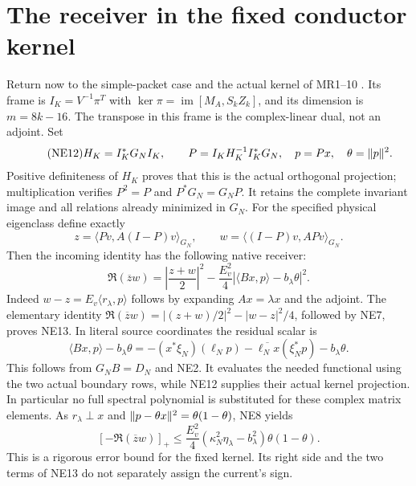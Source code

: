 \documentclass[11pt]{article}
\begin{document}
\section{The receiver in the fixed conductor kernel}
Return now to the simple-packet case and the actual kernel of MR1--10
\cite{ne-MR}. Its frame is $I_K=V^{-1}\pi^T$ with
$\ker\pi=\operatorname{im}[M_A,S_kZ_k]$, and its dimension is
$m=8k-16$. The transpose in this frame is the complex-linear dual,
not an adjoint. Set
\begin{equation}\tag{NE12}
H_K=I_K^*G_NI_K,\qquad P=I_KH_K^{-1}I_K^*G_N,
\quad p=Px,\quad\theta=\lVert p\rVert^2.
\end{equation}
Positive definiteness of $H_K$ proves that this is the actual
orthogonal projection; multiplication verifies $P^2=P$ and
$P^*G_N=G_NP$. It retains the complete invariant image and all
relations already minimized in $G_N$.
For the specified physical eigenclass define exactly
\[
z=\langle Pv,A(I-P)v\rangle_{G_N},\qquad
w=\langle(I-P)v,APv\rangle_{G_N}.
\]
Then the incoming identity has the following native receiver:
\begin{equation}\tag{NE13}
\boxed{\Re(\overline zw)=\left|\frac{z+w}{2}\right|^2
-\frac{E_v^2}{4}\left|\langle Bx,p\rangle-b_\lambda\theta\right|^2.}
\end{equation}
Indeed $w-z=E_v\langle r_\lambda,p\rangle$ follows by expanding
$Ax=\lambda x$ and the adjoint. The elementary identity
$\Re(\overline zw)=|(z+w)/2|^2-|w-z|^2/4$, followed by NE7,
proves NE13. In literal source coordinates the residual scalar is
\begin{equation}\tag{NE14}
\langle Bx,p\rangle-b_\lambda\theta
=-(x^*\xi_N)(\ell_Np)
-\overline{\ell_Nx}(\xi_N^*p)-b_\lambda\theta.
\end{equation}
This follows from $G_NB=D_N$ and NE2. It evaluates the needed
functional using the two actual boundary rows, while NE12 supplies
their actual kernel projection. In particular no full spectral
polynomial is substituted for these complex matrix elements.
As $r_\lambda\perp x$ and
$\lVert p-\theta x\rVert^2=\theta(1-\theta)$, NE8 yields
\begin{equation}\tag{NE15}
[-\Re(\overline zw)]_+
\le\frac{E_v^2}{4}
(\kappa_N^2\eta_\lambda-b_\lambda^2)\theta(1-\theta).
\end{equation}
This is a rigorous error bound for the fixed kernel. Its right side
and the two terms of NE13 do not separately assign the current's sign.
\end{document}
